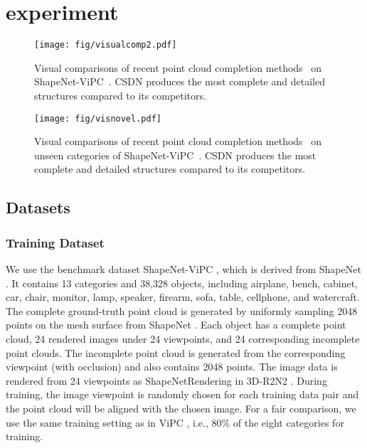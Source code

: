 \section{experiment}
\begin{figure*}[ht]
  \centering
  \texttt{[image: fig/visualcomp2.pdf]}
  \caption{Visual comparisons of recent point cloud completion methods~\cite{xie2020grnet,yu2021pointr,zhang2021view,zhou2022seedformer} on ShapeNet-ViPC~\cite{zhang2021view}. CSDN produces the most complete and detailed structures compared to its competitors.}
  \label{fig:visualcomp}
\end{figure*} 
\begin{figure*}[h]
  \centering
  \texttt{[image: fig/visnovel.pdf]}
  \caption{Visual comparisons of recent point cloud completion methods~\cite{xie2020grnet,yu2021pointr,zhang2021view,wang2022pointattn} on unseen categories of ShapeNet-ViPC~\cite{zhang2021view}. CSDN produces the most complete and detailed structures compared to its competitors.}
  \label{fig:visnovel}
\end{figure*}  
\subsection{Datasets}
\subsubsection{Training Dataset}
We use the benchmark dataset ShapeNet-ViPC \cite{zhang2021view}, which is derived from ShapeNet \cite{chang2015shapenet}. 
It contains 13 categories and 38,328 objects, including airplane, bench, cabinet, car, chair, monitor, lamp, speaker, firearm, sofa, table, cellphone, and watercraft. The complete ground-truth point cloud is generated by uniformly sampling 2048 points on the mesh surface from ShapeNet \cite{chang2015shapenet}. Each object has a complete point cloud, 24 rendered images under 24 viewpoints, and 24 corresponding incomplete point clouds. The incomplete point cloud is generated from the corresponding viewpoint (with occlusion) and also contains 2048 points. The image data is rendered from 24 viewpoints as ShapeNetRendering in 3D-R2N2 \cite{choy20163d}. During training, the image viewpoint is randomly chosen for each training data pair and the point cloud will be aligned with the chosen image. For a fair comparison, we use the same training setting as in ViPC \cite{zhang2021view}, i.e., 80\% of the eight categories for training.

